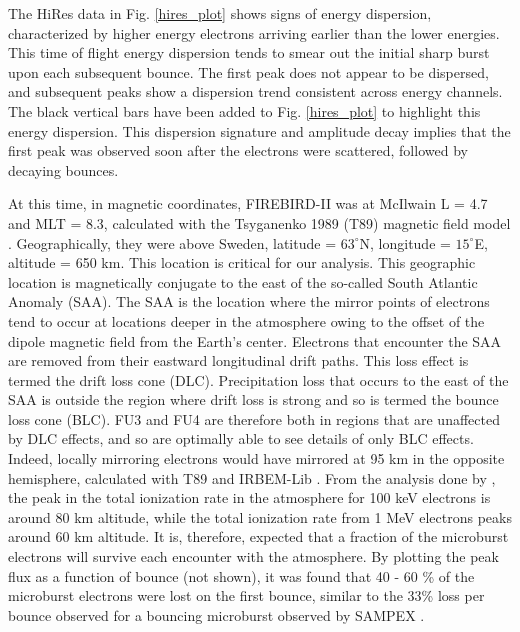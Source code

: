 \documentclass[draft, linenumbers]{agujournal}
\begin{document}
The HiRes data in Fig. \ref{hires_plot} shows signs of energy dispersion, characterized by higher energy electrons arriving earlier than the lower energies. This time of flight energy dispersion tends to smear out the initial sharp burst upon each subsequent bounce. The first peak does not appear to be dispersed, and subsequent peaks show a dispersion trend consistent across energy channels. The black vertical bars have been added to Fig. \ref{hires_plot} to highlight this energy dispersion. This dispersion signature and amplitude decay implies that the first peak was observed soon after the electrons were scattered, followed by decaying bounces.

At this time, in magnetic coordinates, FIREBIRD-II was at McIlwain L = 4.7 and MLT = 8.3, calculated with the Tsyganenko 1989 (T89) magnetic field model \citep{Tsyganenko1989}. Geographically, they were above Sweden, latitude = $63^{\circ}$N, longitude = $15^{\circ}$E, altitude = 650 km. This location is critical for our analysis. This geographic location is magnetically conjugate to the east of the so-called South Atlantic Anomaly (SAA). The SAA is the location where the mirror points of electrons tend to occur at locations deeper in the atmosphere owing to the offset of the dipole magnetic field from the Earth's center. Electrons that encounter the SAA are removed from their eastward longitudinal drift paths. This loss effect is termed the drift loss cone (DLC). Precipitation loss that occurs to the east of the SAA is outside the region where drift loss is strong and so is termed the bounce loss cone (BLC).  FU3 and FU4 are therefore both in regions that are unaffected by DLC effects, and so are optimally able to see details of only BLC effects. Indeed, locally mirroring electrons would have mirrored at 95 km in the opposite hemisphere, calculated with T89 and IRBEM-Lib \citep{irbem}. From the analysis done by \citet{Fang2010}, the peak in the total ionization rate in the atmosphere for 100 keV electrons is around 80 km altitude, while the total ionization rate from 1 MeV electrons peaks around 60 km altitude. It is, therefore, expected that a fraction of the microburst electrons will survive each encounter with the atmosphere. By plotting the peak flux as a function of bounce (not shown), it was found that 40 - 60 \% of the microburst electrons were lost on the first bounce, similar to the 33\% loss per bounce observed for a bouncing microburst observed by SAMPEX \citep{Thorne2005}.
\end{document}
